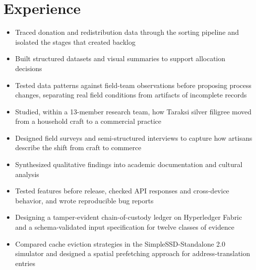 \section{Experience}
\begin{itemize}
  \item Traced donation and redistribution data through the sorting pipeline and isolated the stages that created backlog
  \item Built structured datasets and visual summaries to support allocation decisions
  \item Tested data patterns against field-team observations before proposing process changes, separating real field conditions from artifacts of incomplete records
\end{itemize}
\begin{itemize}
  \item Studied, within a 13-member research team, how Taraksi silver filigree moved from a household craft to a commercial practice
  \item Designed field surveys and semi-structured interviews to capture how artisans describe the shift from craft to commerce
  \item Synthesized qualitative findings into academic documentation and cultural analysis
\end{itemize}
\begin{itemize}
  \item Tested features before release, checked API responses and cross-device behavior, and wrote reproducible bug reports
\end{itemize}
\begin{itemize}
  \item Designing a tamper-evident chain-of-custody ledger on Hyperledger Fabric and a schema-validated input specification for twelve classes of evidence
\end{itemize}
\begin{itemize}
  \item Compared cache eviction strategies in the SimpleSSD-Standalone 2.0 simulator and designed a spatial prefetching approach for address-translation entries
\end{itemize}
